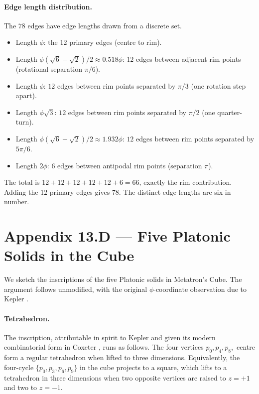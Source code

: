 \paragraph{Edge length distribution.}
The $78$ edges have edge lengths drawn from a discrete set.
\begin{itemize}
\item Length $\phi$: the $12$ primary edges (centre to rim).
\item Length $\phi(\sqrt{6} - \sqrt{2})/2 \approx 0.518\phi$: $12$
  edges between adjacent rim points (rotational separation
  $\pi/6$).
\item Length $\phi$: $12$ edges between rim points separated by
  $\pi/3$ (one rotation step apart).
\item Length $\phi\sqrt{3}$: $12$ edges between rim points
  separated by $\pi/2$ (one quarter-turn).
\item Length $\phi(\sqrt{6} + \sqrt{2})/2 \approx 1.932\phi$: $12$
  edges between rim points separated by $5\pi/6$.
\item Length $2\phi$: $6$ edges between antipodal rim points
  (separation $\pi$).
\end{itemize}

The total is $12 + 12 + 12 + 12 + 12 + 6 = 66$, exactly the rim
contribution. Adding the $12$ primary edges gives $78$. The
distinct edge lengths are six in number.

\section*{Appendix 13.D --- Five Platonic Solids in the Cube}
\label{fa_13:sec:13-appD}

We sketch the inscriptions of the five Platonic solids in
Metatron's Cube. The argument follows \cite{coxeter1973regular}
unmodified, with the original $\phi$-coordinate observation due to
Kepler \cite{kepler_harmonices}.

\paragraph{Tetrahedron.}
The inscription, attributable in spirit to Kepler
\cite{kepler_harmonices} and given its modern combinatorial form
in Coxeter \cite{coxeter1973regular}, runs as follows. The four
vertices $p_{0}, p_{4}, p_{8}, $ centre form a regular
tetrahedron when lifted to three dimensions. Equivalently, the
four-cycle $\{p_{0}, p_{3}, p_{6}, p_{9}\}$ in the cube projects to
a square, which lifts to a tetrahedron in three dimensions when
two opposite vertices are raised to $z = +1$ and two to $z = -1$.

